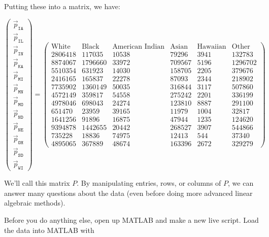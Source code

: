\documentclass{ximera}
\begin{document}
\begin{exploration}
\begin{example}
Putting these into a matrix, we have: 

\[
  \begin{pmatrix}
  \vec{p}_{\texttt{IA}} \\
  \vec{p}_{\texttt{IL}} \\
  \vec{p}_{\texttt{IN}} \\
  \vec{p}_{\texttt{KA}} \\
  \vec{p}_{\texttt{MI}} \\
  \vec{p}_{\texttt{MN}} \\
  \vec{p}_{\texttt{MO}} \\
  \vec{p}_{\texttt{ND}} \\
  \vec{p}_{\texttt{NE}} \\
  \vec{p}_{\texttt{OH}} \\
  \vec{p}_{\texttt{SD}} \\
  \vec{p}_{\texttt{WI}}
  \end{pmatrix}
  =
  \begin{pmatrix}
    \text{White} & \text{Black} & \text{American Indian} & \text{Asian} & \text{Hawaiian} & \text{Other} \\
  2806418 & 117035 & 10538 & 79296 & 3941 & 132783\\
  8874067 & 1796660 & 33972 & 709567 & 5196 & 1296702\\
  5510354 & 631923 & 14030 & 158705 & 2205 & 379676\\
  2416165 & 165837 & 22278 & 87093 & 2344 & 218902\\
  7735902 & 1360149 & 50035 & 316844 & 3117 & 507860\\
  4572149 & 359817 & 54558 & 275242 & 2201 & 336199\\
  4978046 & 698043 & 24274 & 123810 & 8887 & 291100\\
  651470 & 23959 & 39165 & 11979 & 1004 & 32817\\
  1641256 & 91896 & 16875 & 47944 & 1235 & 124620\\
  9394878 & 1442655 & 20442 & 268527 & 3907 & 544866\\
  735228 & 18836 & 74975 & 12413 & 544 & 37340\\
  4895065 & 367889 & 48674 & 163396 & 2672 & 329279
  \end{pmatrix}
  \]

  We'll call this matrix $P$. By manipulating entries, rows, or columns of $P$, we can answer many questions about the data (even before doing more advanced linear algebraic methods).

  Before you do anything else, open up MATLAB and make a new live script. Load the data into MATLAB with 


\end{example}
\end{exploration}
\end{document}
